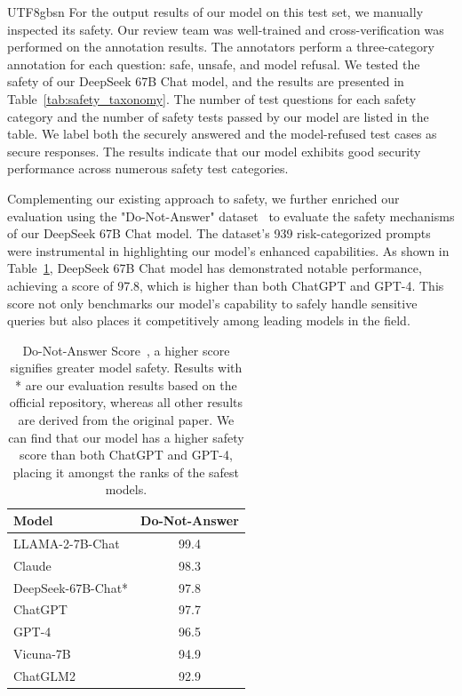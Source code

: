 \documentclass[11pt, a4paper, logo, copyright, nonumbering]{deepseek}
\begin{document}
\begin{CJK*}{UTF8}{gbsn}
For the output results of our model on this test set, we manually inspected its safety. Our review team was well-trained and cross-verification was performed on the annotation results.
The annotators perform a three-category annotation for each question: safe, unsafe, and model refusal. We tested the safety of our DeepSeek 67B Chat model, and the results are presented in Table~\ref{tab:safety_taxonomy}. 
The number of test questions for each safety category and the number of safety tests passed by our model are listed in the table. We label both the securely answered and the model-refused test cases as secure responses. The results indicate that our model exhibits good security performance across numerous safety test categories.

Complementing our existing approach to safety, we further enriched our evaluation using the "Do-Not-Answer" dataset~\citep{donotanswer} to evaluate the safety mechanisms of our DeepSeek 67B Chat model. The dataset's 939 risk-categorized prompts were instrumental in highlighting our model's enhanced capabilities. As shown in Table~\ref{tab:performance_comparison}, DeepSeek 67B Chat model has demonstrated notable performance, achieving a score of 97.8, which is higher than both ChatGPT and GPT-4. This score not only benchmarks our model's capability to safely handle sensitive queries but also places it competitively among leading models in the field. 


\begin{table}[!ht]
\centering \small
\begin{tabular}{lc}
\toprule
Model &  Do-Not-Answer \\ \midrule
LLAMA-2-7B-Chat & 99.4\\ 
Claude & 98.3 \\ 	 
DeepSeek-67B-Chat* & 97.8\\ 
ChatGPT & 97.7\\ 	
GPT-4 & 96.5\\ 
Vicuna-7B & 94.9\\ 
ChatGLM2 & 92.9\\ 
\bottomrule
\end{tabular}
\caption{Do-Not-Answer Score~\citep{donotanswer}, a higher score signifies greater model safety. Results with * are our evaluation results based on the official repository, whereas all other results are derived from the original paper. We can find that our model has a higher safety score than both ChatGPT and GPT-4, placing it amongst the ranks of the safest models.}
\label{tab:performance_comparison}
\end{table}



\end{CJK*}
\end{document}
